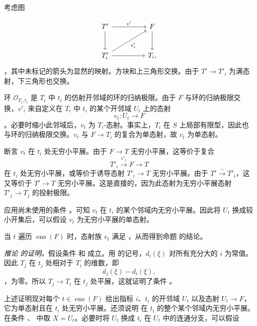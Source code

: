 考虑图

 \[
\begin{tikzcd}[column sep=huge,row sep=large]
  T' \arrow[r,"v'"] \arrow[d] & F \arrow[d] \\
  T'_i \arrow[r] \arrow[ur,"v'_i"'] & T_i ,
\end{tikzcd}
\]，其中未标记的箭头为显然的映射。方块和上三角形交换。由于 \(T'\to T'_i\) 为满态射，下三角形也交换。

环 \(\mathscr O_{T_i,t_i}\) 是 \(T_i\) 中 \(t_i\) 的仿射开邻域的环的归纳极限。由于 \(F\) 与环的归纳极限交换，\(v'_i\) 来自定义在 \(T_i\) 中 \(t_i\) 的某个开邻域 \(U_t\) 上的态射  \[
  v_t:U_t\longrightarrow F
\]。必要时缩小此邻域后，\(v_t\) 为 \(T_i\)-态射。事实上，\(T_i\) 在 \(S\) 上局部有限型，因此也与环的归纳极限交换。\(v_t\) 与 \(F\to T_i\) 的复合为单态射，故 \(v_t\) 为单态射。

断言 \(v_t\) 在 \(t_i\) 处无穷小平展。由于 \(F\to T\) 无穷小平展，这等价于复合 \[
  T'_i\xrightarrow{v'_i}F\longrightarrow T
\] 在 \(t_i\) 处无穷小平展，或等价于诱导态射 \(T'_i\to T\) 无穷小平展。由于 \(T'\xrightarrow{\sim}T'_i\)，这又等价于 \(T'\to T\) 无穷小平展。这是直接的，因为此态射为无穷小平展态射 \(T'_j\to T_j\) 的投射极限。

应用尚未使用的条件 。可知 \(v_t\) 在 \(t_i\) 的某个邻域内无穷小平展。因此将 \(U_t\) 换成较小开集后，可以假设 \(v_t\) 为无穷小平展的单态射。

当 \(t\) 遍历 \(\operatorname{ens}(F)\) 时，态射族 \(v_t\) 满足 ，从而得到命题  的结论。

\smallskip\noindent\emph{推论  的证明。}假设条件  和  成立。用  的记号，\(d_i(\xi)\) 对所有充分大的 \(i\) 为常值。因此 \(T_j\) 在 \(t_j\) 处相对于 \(T_i\) 的维数，即 \[
  d_j(\xi)-d_i(\xi),
\]，为零。所以 \(T_j\to T_i\) 在 \(t_j\) 处平展，这就证明了条件 。

上述证明现对每个 \(t\in\operatorname{ens}(F)\) 给出指标 \(i\)、\(t_i\) 的开邻域 \(U_t\) 以及态射 \(U_t\to F\)，它为单态射且在 \(t_i\) 处无穷小平展。还须说明  在 \(t_i\) 的整个某个邻域内无穷小平展。在条件 、 中取 \(X=U_t\)。必要时将 \(U_t\) 换成 \(t_i\) 在 \(U_t\) 中的连通分支，可以假设

